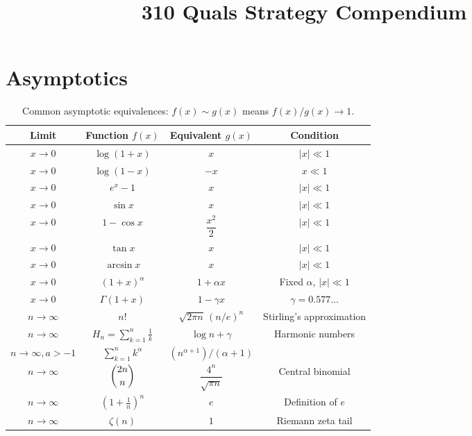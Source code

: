 \documentclass{article}
\title{310 Quals Strategy Compendium}
\begin{document}
\section{Asymptotics}
\begin{table}[ht]
\centering
\renewcommand{\arraystretch}{1.4}
\begin{tabular}{|c|c|c|c|}
\hline
\textbf{Limit} & \textbf{Function \(f(x)\)} & \textbf{Equivalent \(g(x)\)} & \textbf{Condition} \\
\hline
\(x \to 0\) & \(\log(1 + x)\) & \(x\) & \(|x| \ll 1\) \\
\(x \to 0\) & \(\log(1 - x)\) & \(-x\) & \(x \ll 1\) \\
\(x \to 0\) & \(e^x - 1\) & \(x\) & \(|x| \ll 1\) \\
\(x \to 0\) & \(\sin x\) & \(x\) & \(|x| \ll 1\) \\
\(x \to 0\) & \(1 - \cos x\) & \(\dfrac{x^2}{2}\) & \(|x| \ll 1\) \\
\(x \to 0\) & \(\tan x\) & \(x\) & \(|x| \ll 1\) \\
\(x \to 0\) & \(\arcsin x\) & \(x\) & \(|x| \ll 1\) \\
\(x \to 0\) & \((1 + x)^\alpha\) & \(1 + \alpha x\) & Fixed \(\alpha\), \(|x| \ll 1\) \\
\(x \to 0\) & \(\Gamma(1 + x)\) & \(1 - \gamma x\) & \(\gamma = 0.577\ldots\) \\
\hline
\(n \to \infty\) & \(n!\) & \(\sqrt{2\pi n}\,(n/e)^n\) & Stirling’s approximation \\
\(n \to \infty\) & \(H_n = \sum_{k=1}^n \frac{1}{k}\) & \(\log n + \gamma\) & Harmonic numbers \\
$n \to \infty , a>-1$ & $\sum_{k=1}^n k^{\alpha} $ & $ (n^{\alpha+1})/(\alpha+1)$ &   \\
\(n \to \infty \) & \(\dbinom{2n}{n}\) & \(\dfrac{4^n}{\sqrt{\pi n}}\) & Central binomial \\
\(n \to \infty\) & \(\left(1 + \frac{1}{n}\right)^n\) & \(e\) & Definition of \(e\) \\
\(n \to \infty\) & \(\zeta(n)\) & \(1\) & Riemann zeta tail \\
\hline
\end{tabular}
\caption{Common asymptotic equivalences: \(f(x) \sim g(x)\) means \(f(x)/g(x) \to 1\).}
\end{table}
\end{document}

